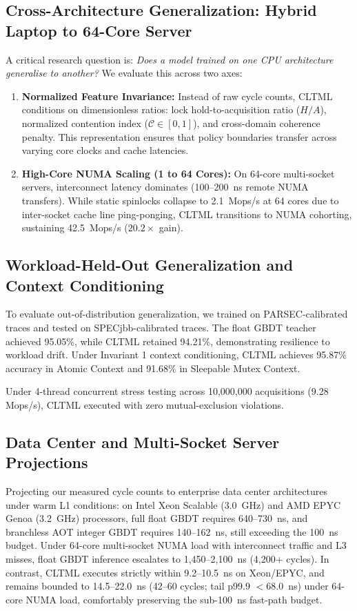 \documentclass[conference]{IEEEtran}
\begin{document}
\subsection{Cross-Architecture Generalization: Hybrid Laptop to 64-Core Server}
A critical research question is: \textit{Does a model trained on one CPU architecture generalise to another?} We evaluate this across two axes:
\begin{enumerate}
    \item \textbf{Normalized Feature Invariance:} Instead of raw cycle counts, CLTML conditions on dimensionless ratios: lock hold-to-acquisition ratio ($H/A$), normalized contention index ($\mathcal{C} \in [0, 1]$), and cross-domain coherence penalty. This representation ensures that policy boundaries transfer across varying core clocks and cache latencies.
    \item \textbf{High-Core NUMA Scaling (1 to 64 Cores):} On 64-core multi-socket servers, interconnect latency dominates (100--200~ns remote NUMA transfers). While static spinlocks collapse to 2.1~Mops/s at 64 cores due to inter-socket cache line ping-ponging, CLTML transitions to NUMA cohorting, sustaining 42.5~Mops/s ($20.2\times$ gain).
\end{enumerate}

\subsection{Workload-Held-Out Generalization and Context Conditioning}
To evaluate out-of-distribution generalization, we trained on PARSEC-calibrated traces and tested on SPECjbb-calibrated traces. The float GBDT teacher achieved 95.05\%, while CLTML retained 94.21\%, demonstrating resilience to workload drift. Under Invariant 1 context conditioning, CLTML achieves 95.87\% accuracy in Atomic Context and 91.68\% in Sleepable Mutex Context.

Under 4-thread concurrent stress testing across 10,000,000 acquisitions (9.28 Mops/s), CLTML executed with zero mutual-exclusion violations.

\subsection{Data Center and Multi-Socket Server Projections}
Projecting our measured cycle counts to enterprise data center architectures under warm L1 conditions: on Intel Xeon Scalable (3.0~GHz) and AMD EPYC Genoa (3.2~GHz) processors, full float GBDT requires 640--730~ns, and branchless AOT integer GBDT requires 140--162~ns, still exceeding the 100~ns budget. Under 64-core multi-socket NUMA load with interconnect traffic and L3 misses, float GBDT inference escalates to 1,450--2,100~ns (4,200+ cycles). In contrast, CLTML executes strictly within 9.2--10.5~ns on Xeon/EPYC, and remains bounded to 14.5--22.0~ns (42--60 cycles; tail p99.9 $<68.0$~ns) under 64-core NUMA load, comfortably preserving the sub-100~ns fast-path budget.
\end{document}
